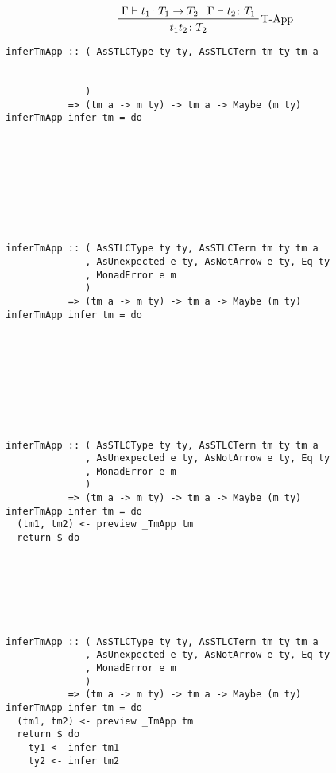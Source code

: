 \documentclass[aspectration=169]{beamer}
\begin{document}
\begin{frame}[fragile]
  \begin{displaymath}  
    \prftree[r]{T-App}
    {\Gamma \vdash t_1 \colon T_1 \rightarrow T_2}
    {\Gamma \vdash t_2 \colon T_1}
    {t_1 t_2 \colon T_2}
  \end{displaymath}  
  \begin{overprint}
  \begin{verbatim}
inferTmApp :: ( AsSTLCType ty ty, AsSTLCTerm tm ty tm a


              )
           => (tm a -> m ty) -> tm a -> Maybe (m ty)
inferTmApp infer tm = do









  \end{verbatim}  
  \begin{verbatim}
inferTmApp :: ( AsSTLCType ty ty, AsSTLCTerm tm ty tm a
              , AsUnexpected e ty, AsNotArrow e ty, Eq ty
              , MonadError e m
              )
           => (tm a -> m ty) -> tm a -> Maybe (m ty)
inferTmApp infer tm = do









  \end{verbatim}  
  \begin{verbatim}
inferTmApp :: ( AsSTLCType ty ty, AsSTLCTerm tm ty tm a
              , AsUnexpected e ty, AsNotArrow e ty, Eq ty
              , MonadError e m
              )
           => (tm a -> m ty) -> tm a -> Maybe (m ty)
inferTmApp infer tm = do
  (tm1, tm2) <- preview _TmApp tm
  return $ do







  \end{verbatim}  
  \begin{verbatim}
inferTmApp :: ( AsSTLCType ty ty, AsSTLCTerm tm ty tm a
              , AsUnexpected e ty, AsNotArrow e ty, Eq ty
              , MonadError e m
              )
           => (tm a -> m ty) -> tm a -> Maybe (m ty)
inferTmApp infer tm = do
  (tm1, tm2) <- preview _TmApp tm
  return $ do
    ty1 <- infer tm1
    ty2 <- infer tm2






\end{verbatim}
\end{overprint}
\end{frame}
\end{document}
